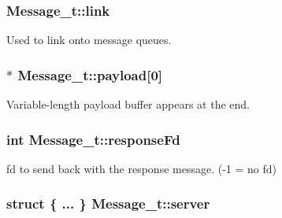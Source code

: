 \subsubsection[{\texorpdfstring{link}{link}}]{ Message\+\_\+t\+::link}\hypertarget{struct_message__t_aae910d35876e87b3e7a16693cb46a37b}{}\label{struct_message__t_aae910d35876e87b3e7a16693cb46a37b}


Used to link onto message queues. 

\subsubsection[{\texorpdfstring{payload}{payload}}]{$\ast$ Message\+\_\+t\+::payload\mbox{[}0\mbox{]}}\hypertarget{struct_message__t_afa4218314a81845b88c91593fff1975d}{}\label{struct_message__t_afa4218314a81845b88c91593fff1975d}


Variable-\/length payload buffer appears at the end. 

\subsubsection[{\texorpdfstring{response\+Fd}{responseFd}}]{\setlength{\rightskip}{0pt plus 5cm}int Message\+\_\+t\+::response\+Fd}\hypertarget{struct_message__t_ae3d040d7597200ed9058f8d4310e1562}{}\label{struct_message__t_ae3d040d7597200ed9058f8d4310e1562}


fd to send back with the response message. (-\/1 = no fd) 

\subsubsection[{\texorpdfstring{server}{server}}]{\setlength{\rightskip}{0pt plus 5cm}struct \{ ... \} 
         Message\+\_\+t\+::server}\hypertarget{struct_message__t_a802c78c4a40d53886ca63c2309d38113}{}\label{struct_message__t_a802c78c4a40d53886ca63c2309d38113}


